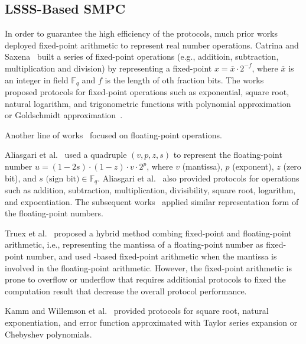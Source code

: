 \subsection{LSSS-Based SMPC}
\label{subsec:LSSS-BasedSMPC}
In order to guarantee the high efficiency of the \smpc protocols, much prior works~\cite{catrina2010secure,liedel2012secure,hemenway2016high,aly2019benchmarking,lu2020faster} deployed fixed-point arithmetic to represent real number operations.
Catrina and Saxena~\cite{catrina2010secure} built a series of fixed-point operations (e.g., additioin, subtraction, multiplication and division) by representing a fixed-point $x = \overline{x}\cdot  2^{-f}$, where $\overline{x}$ is an integer in field $\mathbb{F} _q$ and $f$ is the length of oth fraction bits.
The works~\cite{liedel2012secure,hemenway2016high,aly2019benchmarking,lu2020faster} proposed protocols for fixed-point operations such as exponential, square root, natural logarithm, and trigonometric functions with polynomial approximation~\cite{hart1978computer} or Goldschmidt approximation~\cite{markstein2004software}.

Another line of works~\cite{aliasgari2012secure,krips2014hybrid,kamm2015secure,rathee2022secfloat} focused on floating-point operations.

Aliasgari et al.~\cite{aliasgari2012secure} used a quadruple $\left(v, p, z, s\right) $ to represent the floating-point number $u= \left(1-2s\right) \cdot \left(1-z\right) \cdot v \cdot 2^p$, where $v$ (mantissa), $p$ (exponent), $z$ (zero bit), and $s \text{ (sign bit)}\in \mathbb{F} _q$. Aliasgari et al.~\cite{aliasgari2012secure} also provided \smpc protocols for operations such as addition, subtraction, multiplication, divisibility, square root, logarithm, and expoentiation.
The subsequent works~\cite{krips2014hybrid,kamm2015secure,rathee2022secfloat} applied similar representation form of the floating-point numbers.

Truex et al.~\cite{truex2019hybrid} proposed a hybrid method combing fixed-point and floating-point arithmetic, i.e., representing the mantissa of a floating-point number as fixed-point number, and used \lsss-based fixed-point arithmetic when the mantissa is involved in the floating-point arithmetic. However, the fixed-point arithmetic is prone to overflow or underflow that requires additionial \smpc protocols to fixed the computation result that decrease the overall protocol performance.

Kamm and Willemson et al.~\cite{kamm2015secure} provided \smcp protocols for square root, natural exponentiation, and error function approximated with Taylor series expansion or Chebyshev polynomials.

